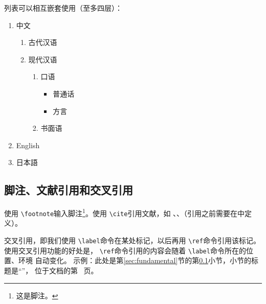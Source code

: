 \documentclass[zihao = -4, linespread = 1.5]{ctexart}
\begin{document}
列表可以相互嵌套使用（至多四层）：
\begin{enumerate}
  \item 中文
  \begin{enumerate}
    \item 古代汉语
    \item 现代汉语
    \begin{enumerate}
      \item 口语
      \begin{itemize}
        \item 普通话
        \item 方言
      \end{itemize}
      \item 书面语
    \end{enumerate}
  \end{enumerate}
  \item English
  \item 日本語
\end{enumerate}

\subsection{脚注、文献引用和交叉引用}\label{subsec:crossRef}
使用 \texttt{\textbackslash footnote}输入脚注\footnote{这是脚注。 }。使用 \texttt{\textbackslash cite}引用文献，如 \cite{PangQingShan}、\cite{HuGang, LiMing, Dupont}、\cite{url}（引用之前需要在中定义）。

交叉引用，即我们使用 \texttt{\textbackslash label}命令在某处标记，以后再用 \texttt{\textbackslash ref}命令引用该标记。
使用交叉引用功能的好处是， \texttt{\textbackslash ref}命令引用的内容会随着 \texttt{\textbackslash label}命令所在的位置、环境
自动变化。
示例：此处是第\ref{sec:fundamental}节的第\ref{subsec:crossRef}小节，小节的标题是“”，
位于文档的第~\pageref{subsec:crossRef} 页。%

\end{document}
